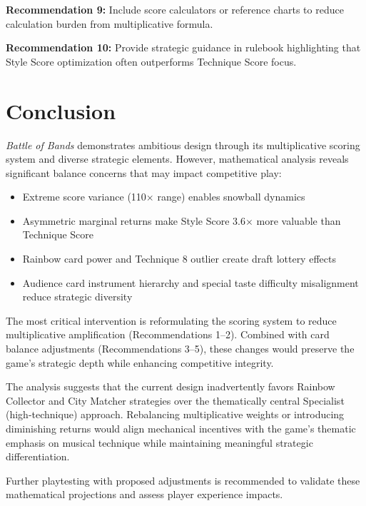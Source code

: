\documentclass[11pt,a4paper]{article}
\begin{document}
\textbf{Recommendation 9:} Include score calculators or reference charts to reduce calculation burden from multiplicative formula.

\textbf{Recommendation 10:} Provide strategic guidance in rulebook highlighting that Style Score optimization often outperforms Technique Score focus.

\section{Conclusion}

\textit{Battle of Bands} demonstrates ambitious design through its multiplicative scoring system and diverse strategic elements. However, mathematical analysis reveals significant balance concerns that may impact competitive play:

\begin{itemize}[itemsep=2pt]
    \item Extreme score variance (110$\times$ range) enables snowball dynamics
    \item Asymmetric marginal returns make Style Score 3.6$\times$ more valuable than Technique Score
    \item Rainbow card power and Technique 8 outlier create draft lottery effects
    \item Audience card instrument hierarchy and special taste difficulty misalignment reduce strategic diversity
\end{itemize}

The most critical intervention is reformulating the scoring system to reduce multiplicative amplification (Recommendations 1--2). Combined with card balance adjustments (Recommendations 3--5), these changes would preserve the game's strategic depth while enhancing competitive integrity.

The analysis suggests that the current design inadvertently favors Rainbow Collector and City Matcher strategies over the thematically central Specialist (high-technique) approach. Rebalancing multiplicative weights or introducing diminishing returns would align mechanical incentives with the game's thematic emphasis on musical technique while maintaining meaningful strategic differentiation.

Further playtesting with proposed adjustments is recommended to validate these mathematical projections and assess player experience impacts.
\end{document}
